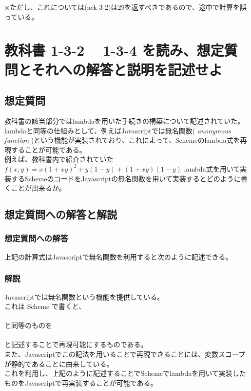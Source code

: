 \documentclass[a4paper,12pt]{article}
\begin{document}
※ただし、これについては(ack 3 2)は29を返すべきであるので、途中で計算を誤っている。

\section{教科書 1-3-2 ~ 1-3-4 を読み、想定質問とそれへの解答と説明を記述せよ}

\subsection{想定質問}

教科書の該当部分ではlambdaを用いた手続きの構築について記述されていた。\\
lambdaと同等の仕組みとして、例えばJavascriptでは無名関数( {\it anonymous function} )という機能が実装されており、これによって、Schemeのlambda式を再現することが可能である。\\
例えば、教科書内で紹介されていた\\
$ f(x,y) = x(1+xy)^2 + y(1-y) + (1+xy)(1-y)$
lambda式を用いて実装するSchemeのコードをJavascriptの無名関数を用いて実装するとどのように書くことが出来るか。

\subsection{想定質問への解答と解説}
\subsubsection{想定質問への解答}
上記の計算式はJavascriptで無名関数を利用すると次のように記述できる。

\subsubsection{解説}

Javascriptでは無名関数という機能を提供している。\\
これは Scheme で書くと、\\
\\
と同等のものを\\
\\
と記述することで再現可能にするものである。\\
また、Javascriptでこの記法を用いることで再現できることには、変数スコープが静的であることに由来している。\\
これを利用し、上記のように記述することでSchemeでlambdaを用いて実装したものをJavascriptで再実装することが可能である。
\end{document}
